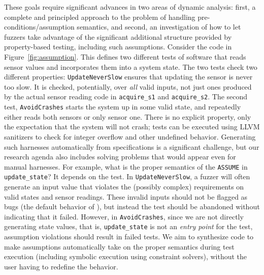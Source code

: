   These goals require significant advances in two areas of dynamic analysis: first, a complete and principled approach to the problem of handling pre-conditions/assumption semantics, and second, an investigation of how to let fuzzers take advantage of the significant additional structure provided by property-based testing, including such assumptions.  Consider the code in Figure~\ref{fig:assumption}.  This defines two different tests of software that reads sensor values and incorporates them into a system state.  The two tests check two different properties:  {\tt UpdateNeverSlow} ensures that updating the sensor is never too slow.  It is checked, potentially, over \emph{all} valid inputs, not just ones produced by the actual sensor reading code in {\tt acquire\_s1} and {\tt acquire\_s2}.  The second test, {\tt AvoidCrashes} starts the system up in some valid state, and repeatedly either reads both sensors or only sensor one.  There is no explicit property, only the expectation that the system will not crash; tests can be executed using LLVM sanitizers to check for integer overflow and other undefined behavior.  Generating such harnesses automatically from \acsl specifications is a significant challenge, but our research agenda also includes solving problems that would appear even for manual harnesses.  For example, what is the proper semantics of the {\tt ASSUME} in {\tt update\_state}?  It depends on the test.  In {\tt UpdateNeverSlow}, a fuzzer will often generate an input value that violates the (possibly complex) requirements on valid states and sensor readings.  These invalid inputs should not be flagged as bugs (the default behavior of \eacsl), but instead the test should be abandoned without indicating that it failed.  However, in {\tt AvoidCrashes}, since we are not directly generating state values, that is, {\tt update\_state} is not an \emph{entry point} for the test, assumption violations should result in failed tests.  We aim to synthesize code to make assumptions automatically take on the proper semantics during test execution (including symbolic execution using constraint solvers), without the user having to redefine the behavior. 


